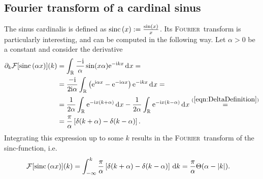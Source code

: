 \documentclass[german, parskip=full]{scrartcl}
\newcommand{\intx}{}
\newcommand{\intr}{}
\newcommand{\kla}{}
\newcommand{\klam}{}
\newcommand{\tecxt}{}
\newcommand{\I}{\text{i}}
\newcommand{\e}{\text{e}}
\newcommand*{\Fourier}{\textsc{Fourier}\ }
\newcommand*{\F}{\mathcal{F}}
\newcommand*{\sinc}{\text{sinc\,}}
\begin{document}
\subsection{Fourier transform of a cardinal sinus}
The sinus cardinalis is defined as $\tecxt\text{sinc\,}(x):=\frac{\sin(x)}{x}$.
Its \Fourier transform is particularly interesting, and can be computed in the following way.
Let $\alpha> 0$ be a constant and consider the derivative
\begin{align*}
\partial_k\F[\tecxt\text{sinc\,}(\alpha x)](k)&=\intr\int_{\mathbb{R}^{}}{\frac{-\I}{\alpha}\sin (x\alpha)\e^{-\I k x}}\,\mathrm{d}^{}x=\\
&=\frac{-\I}{2\I\alpha}\intr\int_{\mathbb{R}^{ }}{\kla\left( {\e^{\I\alpha x}-\e^{-\I\alpha x}} \right)\e^{-\I k x}}\,\mathrm{d}^{ }x=\\
&=\frac{1}{2\alpha}\intr\int_{\mathbb{R}^{ }}{\e^{-\I x(k+\alpha)}}\,\mathrm{d}^{ }x-\frac{1}{2\alpha}\intr\int_{\mathbb{R}^{ }}{\e^{-\I x(k-\alpha)}}\,\mathrm{d}^{ }x\overset{(\ref{eqn:DeltaDefinition})}{=}\\
&=\frac{\pi}{\alpha}\klam\left[ {\delta (k+\alpha)-\delta (k-\alpha)} \right]. 
\end{align*}
Integrating this expression up to some $k$ results in the \Fourier transform of the sinc-function, i.e.
\begin{align}
\F[\sinc(\alpha x)](k)&=\intx\int_{-\infty}^{k}\frac{\pi}{\alpha}\klam\left[ {\delta (k+\alpha)-\delta (k-\alpha)} \right]\,\mathrm{d}k=\frac{\pi}{\alpha}\Theta (\alpha-|k|). \label{eqn:FourierTransformSinc}
\end{align}
\end{document}

